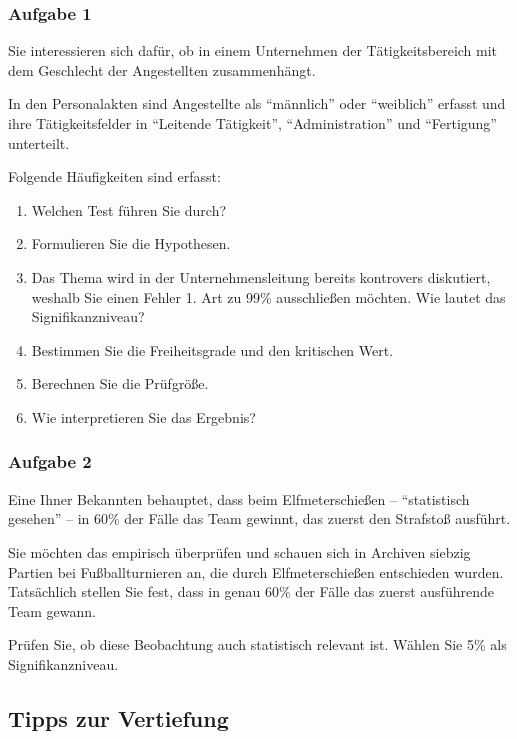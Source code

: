 \documentclass[
  ngerman,
]{article}
\providecommand{\tightlist}{%
  \setlength{\itemsep}{0pt}\setlength{\parskip}{0pt}}
\begin{document}
\hypertarget{aufgabe-1-9}{%
\subsubsection{Aufgabe 1}\label{aufgabe-1-9}}

Sie interessieren sich dafür, ob in einem Unternehmen der Tätigkeitsbereich mit dem Geschlecht der Angestellten zusammenhängt.

In den Personalakten sind Angestellte als ``männlich'' oder ``weiblich'' erfasst und ihre Tätigkeitsfelder in ``Leitende Tätigkeit'', ``Administration'' und ``Fertigung'' unterteilt.

Folgende Häufigkeiten sind erfasst:

\begin{enumerate}
\def\labelenumi{\alph{enumi})}
\tightlist
\item
  Welchen Test führen Sie durch?
\item
  Formulieren Sie die Hypothesen.
\item
  Das Thema wird in der Unternehmensleitung bereits kontrovers diskutiert, weshalb Sie einen Fehler 1. Art zu 99\% ausschließen möchten. Wie lautet das Signifikanzniveau?
\item
  Bestimmen Sie die Freiheitsgrade und den kritischen Wert.
\item
  Berechnen Sie die Prüfgröße.
\item
  Wie interpretieren Sie das Ergebnis?
\end{enumerate}

\hypertarget{aufgabe-2-9}{%
\subsubsection{Aufgabe 2}\label{aufgabe-2-9}}

Eine Ihner Bekannten behauptet, dass beim Elfmeterschießen -- ``statistisch gesehen'' -- in 60\% der Fälle das Team gewinnt, das zuerst den Strafstoß ausführt.

Sie möchten das empirisch überprüfen und schauen sich in Archiven siebzig Partien bei Fußballturnieren an, die durch Elfmeterschießen entschieden wurden. Tatsächlich stellen Sie fest, dass in genau 60\% der Fälle das zuerst ausführende Team gewann.

Prüfen Sie, ob diese Beobachtung auch statistisch relevant ist. Wählen Sie 5\% als Signifikanzniveau.

\hypertarget{tipps-zur-vertiefung-9}{%
\subsection{Tipps zur Vertiefung}\label{tipps-zur-vertiefung-9}}
\end{document}
